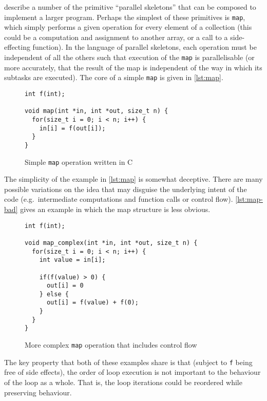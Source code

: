 \documentclass[journal]{IEEEtran}
\begin{document}
\textcite{darlington_parallel_1995} describe a number of the primitive
``parallel skeletons'' that can be composed to implement a larger program.
Perhaps the simplest of these primitives is \texttt{map}, which simply performs
a given operation for every element of a collection (this could be a computation
and assignment to another array, or a call to a side-effecting function). In the
language of parallel skeletons, each operation must be independent of all the
others such that execution of the \texttt{map} is parallelisable (or more
accurately, that the result of the map is independent of the way in which its
subtasks are executed). The core of a simple \texttt{map} is given in
\autoref{lst:map}.

\begin{figure}[h]
  \centering
  \begin{lstlisting}
int f(int);

void map(int *in, int *out, size_t n) {
  for(size_t i = 0; i < n; i++) {
    in[i] = f(out[i]);
  }
}
  \end{lstlisting}
  \caption{Simple \texttt{map} operation written in C}
  \label{lst:map}
\end{figure}

The simplicity of the example in \autoref{lst:map} is somewhat deceptive. There
are many possible variations on the idea that may disguise the underlying intent
of the code (e.g.\ intermediate computations and function calls or control
flow). \autoref{lst:map-bad} gives an example in which the map structure is less
obvious. 

\begin{figure}[h]
  \centering
  \begin{lstlisting}
int f(int);

void map_complex(int *in, int *out, size_t n) {
  for(size_t i = 0; i < n; i++) {
    int value = in[i];

    if(f(value) > 0) {
      out[i] = 0
    } else {
      out[i] = f(value) + f(0);
    }
  }
}
  \end{lstlisting}
  \caption{More complex \texttt{map} operation that includes control flow}
  \label{lst:map-bad}
\end{figure}

The key property that both of these examples share is that (subject to
\texttt{f} being free of side effects), the order of loop execution is not
important to the behaviour of the loop as a whole. That is, the loop iterations
could be reordered while preserving behaviour.
\end{document}
